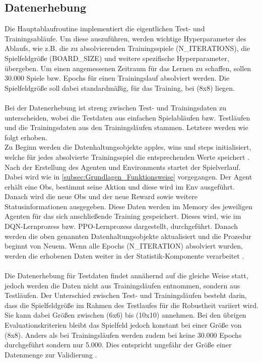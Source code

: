 \subsection{Datenerhebung} \label{subsec:Konzept_Datenerhebung}
Die Hauptablaufroutine implementiert die eigentlichen Test- und Trainingsabläufe.
Um diese auszuführen, werden wichtige Hyperparameter des Ablaufs, wie z.B. die zu absolvierenden Trainingsspiele (N\_ITERATIONS), die Spielfeldgröße (BOARD\_SIZE) und weitere spezifische Hyperparameter, übergeben. Um einen angemessenen Zeitraum für das Lernen zu schaffen, sollen 30.000 Spiele bzw. Epochs für einen Trainingslauf absolviert werden. Die Spielfeldgröße soll dabei standardmäßig, für das Training, bei (8x8) liegen.\\
\\Bei der Datenerhebung ist streng zwischen Test- und Trainingsdaten zu unterscheiden, wobei die Testdaten aus einfachen Spielabläufen bzw. Testläufen und die Trainingsdaten aus den Trainingsläufen stammen. Letztere werden wie folgt erhoben.\\
Zu Beginn werden die Datenhaltungsobjekte apples, wins und steps initialisiert, welche für jedes absolvierte Trainingsspiel die entsprechenden Werte speichert . 
Nach der Erstellung des Agenten und Environments startet der Spielverlauf.\\
Dabei wird wie in \autoref{subsec:Grundlagen_Funktionsweise} vorgegangen. Der Agent erhält eine Obs, bestimmt seine Aktion und diese wird im Env ausgeführt. Danach wird die neue Obs und der neue Reward sowie weitere Statusinformationen ausgegeben. Diese Daten werden im Memory des jeweiligen Agenten für das sich anschließende Training gespeichert. Dieses wird, wie im DQN-Lernprozess  bzw. PPO-Lernprozess  dargestellt, durchgeführt. 
Danach werden die oben genannten Datenhaltungsobjekte aktualisiert und die Prozedur beginnt von Neuem. Wenn alle Epochs (N\_ITERATION) absolviert wurden, werden die erhobenen Daten weiter in der Statistik-Komponente verarbeitet .\\
\\Die Datenerhebung für Testdaten findet annähernd auf die gleiche Weise statt, jedoch werden die Daten nicht aus Trainingsläufen entnommen, sondern aus Testläufen. Der Unterschied zwischen Test- und Trainingsläufen besteht darin, dass die Spielfeldgröße im Rahmen des Testlaufes für die Robustheit variiert wird. Sie kann dabei Größen zwischen (6x6) bis (10x10) annehmen. Bei den übrigen Evaluationskriterien bleibt das Spielfeld jedoch konstant bei einer Größe von (8x8). Anders als bei Trainingsläufen werden zudem bei keine 30.000 Epochs durchgeführt sondern nur 5.000. Dies entspricht ungefähr der Größe einer Datenmenge zur Validierung \cite[S. 134]{DL}.\\
